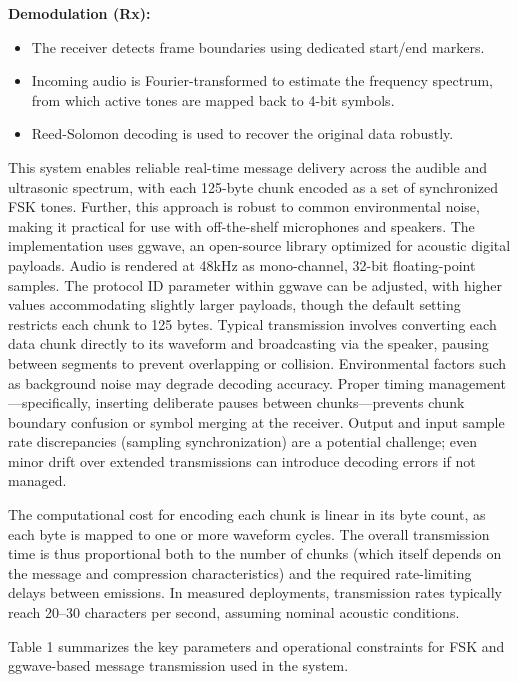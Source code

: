 \documentclass[12pt,openany]{article}
\theoremstyle{definition}
\theoremstyle{definition}
\theoremstyle{definition}
\begin{document}
\noindent
\textbf{Demodulation (Rx):}
\begin{itemize}
    \item The receiver detects frame boundaries using dedicated start/end markers.
    \item Incoming audio is Fourier-transformed to estimate the frequency spectrum, from which active tones are mapped back to 4-bit symbols.
    \item Reed-Solomon decoding is used to recover the original data robustly.
\end{itemize}

This system enables reliable real-time message delivery across the audible and ultrasonic spectrum, with each 125-byte chunk encoded as a set of synchronized FSK tones. Further, this approach is robust to common environmental noise, making it practical for use with off-the-shelf microphones and speakers.
The implementation uses ggwave, an open-source library optimized for acoustic digital payloads. Audio is rendered at 48kHz as mono-channel, 32-bit floating-point samples. The protocol ID parameter within ggwave can be adjusted, with higher values accommodating slightly larger payloads, though the default setting restricts each chunk to 125 bytes. Typical transmission involves converting each data chunk directly to its waveform and broadcasting via the speaker, pausing between segments to prevent overlapping or collision.
Environmental factors such as background noise may degrade decoding accuracy. Proper timing management—specifically, inserting deliberate pauses between chunks—prevents chunk boundary confusion or symbol merging at the receiver. Output and input sample rate discrepancies (sampling synchronization) are a potential challenge; even minor drift over extended transmissions can introduce decoding errors if not managed.

The computational cost for encoding each chunk is linear in its byte count, as each byte is mapped to one or more waveform cycles. The overall transmission time is thus proportional both to the number of chunks (which itself depends on the message and compression characteristics) and the required rate-limiting delays between emissions. In measured deployments, transmission rates typically reach 20–30 characters per second, assuming nominal acoustic conditions.

Table 1 summarizes the key parameters and operational constraints for FSK and ggwave-based message transmission used in the system.
\end{document}
